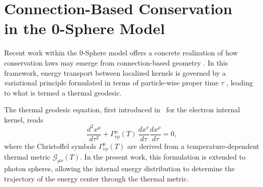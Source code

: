 \documentclass[%
 reprint,
 amsmath,amssymb,
 aps,
 prb,
]{revtex4-2}
\numberwithin{equation}{section}
\begin{document}





\section{Connection-Based Conservation\\ in the 0-Sphere Model}
\label{sec:0sphere_conservation}

Recent work within the 0-Sphere model offers a concrete realization of how conservation laws may emerge from connection-based geometry \cite{hanamura18064535,hanamura17765017}. In this framework, energy transport between localized kernels is governed by a variational principle formulated in terms of
particle-wise proper time $\tau$ \cite{Stueckelberg1941},
leading to what is termed a thermal geodesic.

The thermal geodesic equation, first introduced in~\cite{hanamura17765349} for the electron internal kernel, reads
\begin{equation} \label{eq:thermal_geodesic}
\frac{d^2 x^\mu}{d\tau^2} + \Gamma^\mu_{\nu\rho}(T) \, \frac{dx^\nu}{d\tau} \frac{dx^\rho}{d\tau} = 0,
\end{equation}
where the Christoffel symbols $\Gamma^\mu_{\nu\rho}(T)$ are derived from a temperature-dependent thermal metric $\mathcal{G}_{\mu\nu}(T)$. 
In the present work, this formulation is extended to photon spheres, allowing the internal energy distribution to determine the trajectory of the energy center through the thermal metric.
\end{document}

